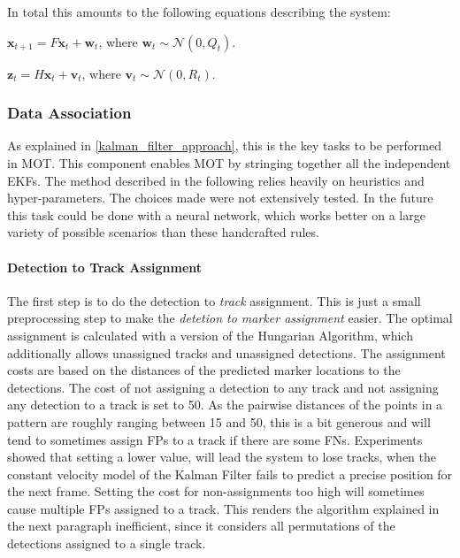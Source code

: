 \documentclass{article}
\begin{document}
In total this amounts to the following equations describing the system:

$\mathbf{x}_{t+1} = F\mathbf{x}_t + \mathbf{w}_t$, where $\mathbf{w}_t \sim \mathcal{N}(0, Q_t)$.

$\mathbf{z}_{t} = H\mathbf{x}_t + \mathbf{v}_t$, where $\mathbf{v}_t \sim \mathcal{N}(0, R_t)$.


\subsubsection{Data Association}
\label{heuristics}
As explained in \ref{kalman_filter_approach}, this is the key tasks to be performed in MOT. This component enables MOT by stringing together all the independent EKFs. The method described in the following relies heavily on heuristics and hyper-parameters. The choices made were not extensively tested. In the future this task could be done with a neural network, which works better on a large variety of possible scenarios than these handcrafted rules.

\paragraph{Detection to Track Assignment} 
The first step is to do the detection to \emph{track} assignment. This is just a small preprocessing step to make the \emph{detetion to marker assignment} easier. The optimal assignment is calculated with a version of the Hungarian Algorithm, which additionally allows unassigned tracks and unassigned detections. The assignment costs are based on the distances of the predicted marker locations to the detections. The cost of not assigning a detection to any track and not assigning any detection to a track is set to 50. As the pairwise distances of the points in a pattern are roughly ranging between 15 and 50, this is a bit generous and will tend to sometimes assign FPs to a track if there are some FNs. Experiments showed that setting a lower value, will lead the system to lose tracks, when the constant velocity model of the Kalman Filter fails to predict a precise position for the next frame. Setting the cost for non-assignments too high will sometimes cause multiple FPs assigned to a track. This renders the algorithm explained in the next paragraph inefficient, since it considers all permutations of the detections assigned to a single track.
\end{document}
